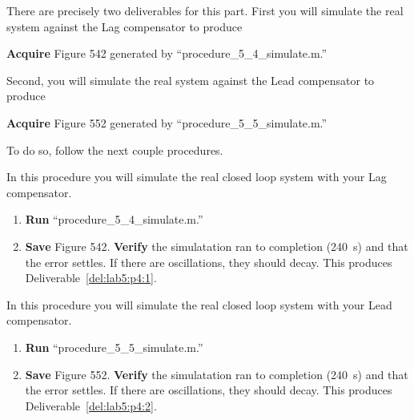 There are precisely two deliverables for this part.
First you will simulate the real system against the Lag compensator to produce
%
\begin{deliverable}[label={del:lab5:p4:1}]
  \textbf{Acquire} Figure 542 generated by ``procedure\_5\_4\_simulate.m.''
\end{deliverable}
%
Second, you will simulate the real system against the Lead compensator to produce
%
\begin{deliverable}[label={del:lab5:p4:2}]
  \textbf{Acquire} Figure 552 generated by ``procedure\_5\_5\_simulate.m.''
\end{deliverable}
%
To do so, follow the next couple procedures.
%
\begin{procedure}[label={proc:lab5:4}]
  In this procedure you will simulate the real closed loop system with your Lag compensator.
  \begin{enumerate}[label={(\arabic*)}]
    \item{%
      \textbf{Run} ``procedure\_5\_4\_simulate.m.''
    }
    \item{%
      \textbf{Save} Figure 542.
      \textbf{Verify} the simulatation ran to completion (\SI{240}{\second}) and that the error settles.
      If there are oscillations, they should decay.
      This produces Deliverable~\ref{del:lab5:p4:1}.
    }
  \end{enumerate}
\end{procedure}
%
\begin{procedure}[label={proc:lab5:5}]
  In this procedure you will simulate the real closed loop system with your Lead compensator.
  \begin{enumerate}[label={(\arabic*)}]
    \item{%
      \textbf{Run} ``procedure\_5\_5\_simulate.m.''
    }
    \item{%
      \textbf{Save} Figure 552.
      \textbf{Verify} the simulatation ran to completion (\SI{240}{\second}) and that the error settles.
      If there are oscillations, they should decay.
      This produces Deliverable~\ref{del:lab5:p4:2}.
    }
  \end{enumerate}
\end{procedure}


